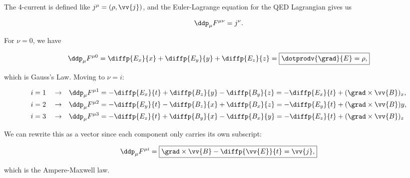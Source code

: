 \section{}

The 4-current is defined like $j^{\mu} = (\rho,\vv{j})$, and the Euler-Lagrange equation for the QED Lagrangian gives us

\begin{equation}
    \ddp_{\mu}F^{\mu\nu} = j^{\nu}.
\end{equation}

For $\nu=0$, we have

\begin{equation*}
    \ddp_{\mu}F^{\mu0} = \diffp{E_x}{x} + \diffp{E_y}{y} + \diffp{E_z}{z} = \boxed{\dotprodv{\grad}{E} = \rho,}
\end{equation*}

which is Gauss's Law. Moving to $\nu=i$:

\begin{align*}
    i=1 \quad\rightarrow\quad &\ddp_{\mu}F^{\mu 1} = -\diffp{E_x}{t} + \diffp{B_z}{y} - \diffp{B_y}{z} = -\diffp{E_x}{t} + (\grad\times\vv{B})_x, \\
    i=2 \quad\rightarrow\quad &\ddp_{\mu}F^{\mu 2} = -\diffp{E_y}{t} - \diffp{B_z}{x} + \diffp{B_x}{z} = -\diffp{E_y}{t} + (\grad\times\vv{B})y, \\
    i=3 \quad\rightarrow\quad &\ddp_{\mu}F^{\mu 3} = -\diffp{E_z}{t} + \diffp{B_y}{x} - \diffp{B_x}{y} = -\diffp{E_z}{t} + (\grad\times\vv{B})_z
\end{align*}

We can rewrite this as a vector since each component only carries its own subscript:

\begin{equation*}
    \ddp_{\mu}F^{\mu i} = \boxed{\grad\times\vv{B} - \diffp{\vv{E}}{t} = \vv{j},}
\end{equation*}

which is the Ampere-Maxwell law.

